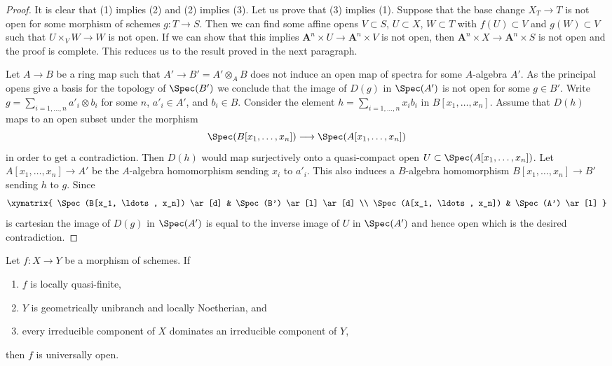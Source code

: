 \begin{proof}
It is clear that (1) implies (2) and (2) implies (3).
Let us prove that (3) implies (1).
Suppose that the base change $X_T \to T$ is not open
for some morphism of schemes $g : T \to S$.
Then we can find some affine opens
$V \subset S$, $U \subset X$, $W \subset T$
with $f(U) \subset V$ and $g(W) \subset V$
such that $U \times_V W \to W$ is not open.
If we can show that this implies
$\mathbf{A}^n \times U \to \mathbf{A}^n \times V$
is not open, then $\mathbf{A}^n \times X \to \mathbf{A}^n \times S$
is not open and the proof is complete. This reduces us
to the result proved in the next paragraph.

\medskip\noindent
Let $A \to B$ be a ring map such that $A' \to B' = A' \otimes_A B$
does not induce an open map of spectra for some $A$-algebra $A'$.
As the principal opens give a basis for the topology of $\Spec(B')$
we conclude that the image of $D(g)$ in $\Spec(A')$
is not open for some $g \in B'$. Write
$g = \sum_{i = 1, \ldots, n} a'_i \otimes b_i$
for some $n$, $a'_i \in A'$, and $b_i \in B$.
Consider the element $h = \sum_{i = 1, \ldots, n} x_i b_i$
in $B[x_1, \ldots, x_n]$. Assume that $D(h)$ maps to
an open subset under the morphism
$$
\Spec(B[x_1, \ldots, x_n]) \longrightarrow \Spec(A[x_1, \ldots, x_n])
$$
in order to get a contradiction. Then $D(h)$ would map surjectively
onto a quasi-compact open $U \subset \Spec(A[x_1, \ldots, x_n])$.
Let $A[x_1, \ldots, x_n] \to A'$ be the $A$-algebra homomorphism
sending $x_i$ to $a'_i$. This also induces a $B$-algebra
homomorphism $B[x_1, \ldots, x_n] \to B'$ sending $h$ to $g$.
Since
$$
\xymatrix{
\Spec(B[x_1, \ldots, x_n]) \ar[d] &
\Spec(B') \ar[l] \ar[d] \\
\Spec(A[x_1, \ldots, x_n]) &
\Spec(A') \ar[l]
}
$$
is cartesian the image of $D(g)$ in $\Spec(A')$ is equal to the
inverse image of $U$ in $\Spec(A')$ and hence open which is
the desired contradiction.
\end{proof}

\begin{lemma}
\label{lemma-quasi-finite-Noetherian-universally-open}
Let $f : X \to Y$ be a morphism of schemes. If
\begin{enumerate}
\item $f$ is locally quasi-finite,
\item $Y$ is geometrically unibranch and locally Noetherian, and
\item every irreducible component of $X$ dominates
an irreducible component of $Y$,
\end{enumerate}
then $f$ is universally open.
\end{lemma}

